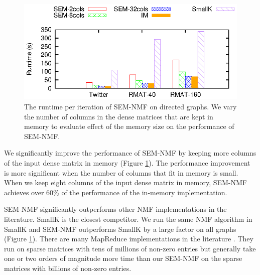 \begin{figure}
	\begin{center}
		\footnotesize
		\includegraphics[scale=1]{SpMM_figs/NMF.eps}
		\caption{The runtime per iteration of SEM-NMF on directed graphs.
			We vary the number of columns in the dense matrices that are kept
			in memory to evaluate effect of the memory size on the performance
		of SEM-NMF.}
		\label{perf:NMF}
	\end{center}
\end{figure}

We significantly improve the performance of SEM-NMF by keeping more columns
of the input dense matrix in memory (Figure \ref{perf:NMF}). The performance
improvement is more significant when the number of columns that fit in memory
is small. When we keep eight columns of the input dense matrix in memory,
SEM-NMF achieves over 60\% of the performance of the in-memory implementation.

SEM-NMF significantly outperforms other NMF implementations in the literature.
SmallK is the closest competitor. We run the same NMF algorithm in SmallK and
SEM-NMF outperforms SmallK by a large factor on all graphs (Figure
\ref{perf:NMF}). There are many MapReduce implementations in
the literature \cite{Liao14, Yin14, Liu10}. They run on sparse
matrices with tens of millions of non-zero entries but generally take
one or two orders of magnitude more time than our SEM-NMF on the sparse matrices
with billions of non-zero entries.
